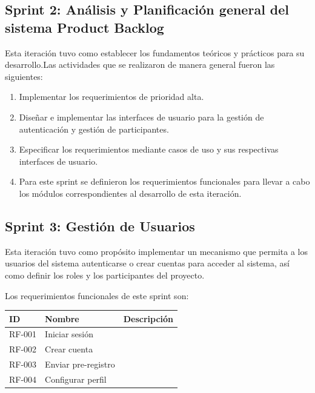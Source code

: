 \subsection{Sprint 2: Análisis y Planificación general del sistema Product Backlog}
Esta iteración tuvo como establecer los fundamentos teóricos y prácticos para su desarrollo.Las actividades que se realizaron 
de manera general fueron las siguientes:
\begin{enumerate}
    \item Implementar los requerimientos de prioridad alta.
    \item Diseñar e implementar las interfaces de usuario para la gestión de autenticación y gestión de
    participantes.
    \item Especificar los requerimientos mediante casos de uso y sus respectivas interfaces de usuario.
    \item Para este sprint se definieron los requerimientos funcionales para llevar a cabo los módulos
    correspondientes al desarrollo de esta iteración.
\end{enumerate} 

\subsection{Sprint 3: Gestión de Usuarios}
Esta iteración tuvo como propósito implementar un mecanismo que permita a
los usuarios del sistema autenticarse o crear cuentas para acceder al sistema, así como definir los
roles y los participantes del proyecto.


Los requerimientos funcionales de este sprint son:

\begin{longtable}{| p{}  | p{} | p{}  |}

    \label{table:herramientasSimilares}
        \rowcolor{black}
        \bf\color{white} ID & \bf \color{white}Nombre	& \bf \color{white}Descripción \\ \hline
    \endhead
    RF-001 &Iniciar sesión & \\ \hline
    RF-002 &Crear cuenta & \\ \hline
    RF-003 &Enviar pre-registro & \\ \hline
    RF-004 &Configurar perfil & \\ \hline
\end{longtable}




